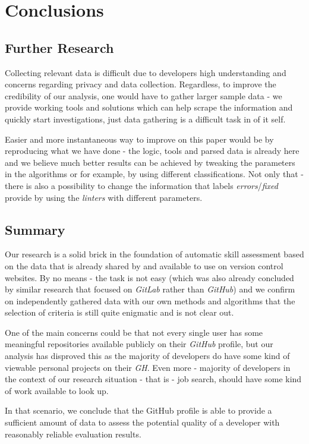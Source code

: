 \section{Conclusions}
\label{sec:conclusions}


\subsection{Further Research}

Collecting relevant data is difficult due to developers high understanding and concerns regarding privacy and data collection. Regardless, to improve the credibility of our analysis, one would have to gather larger sample data - we provide working tools and solutions which can help scrape the information and quickly start investigations, just data gathering is a difficult task in of it self.

Easier and more instantaneous way to improve on this paper would be by reproducing what we have done - the logic, tools and parsed data is already here and we believe much better results can be achieved by tweaking the parameters in the algorithms or for example, by using different classifications. Not only that - there is also a possibility to change the information that labels \emph{errors}/\emph{fixed} provide by using the \emph{linters} with different parameters.

\subsection{Summary}

Our research is a solid brick in the foundation of automatic skill assessment based on the data that is already shared by  and available to use on version control websites. By no means - the task is not easy (which was also already concluded by similar research that focused on \emph{GitLab} rather than \emph{GitHub}) and we confirm on independently gathered data with our own methods and algorithms that the selection of criteria is still quite enigmatic and is not clear out.  

One of the main concerns could be that not every single user has some meaningful repositories available publicly on their \emph{GitHub} profile, but our analysis has disproved this as the majority of developers do have some kind of viewable personal projects on their \emph{GH}. Even more - majority of developers in the context of our research situation - that is - job search, should have some kind of work available to look up.

In that scenario, we conclude that the GitHub profile is able to provide a sufficient amount of data to assess the potential quality of a developer with reasonably reliable evaluation results.

